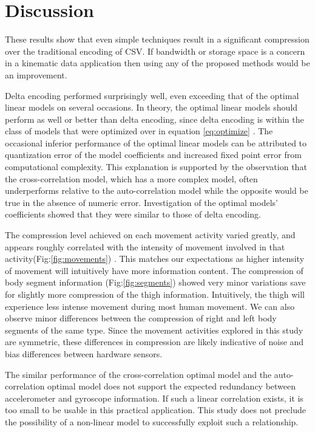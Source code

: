\documentclass[journal]{IEEEtran}
\begin{document}
\begin{table}[htbp]
{\begin{tabular}{|l|r|r|r|r|r|r|r|r|r|r|r|r|}
\end{tabular}%
}%

\end{table}



\section{Discussion}

These results show that even simple techniques result in a significant compression over the traditional encoding of CSV. If bandwidth or storage space is a concern in a kinematic data application then using any of the proposed methods would be an improvement.

Delta encoding performed surprisingly well, even exceeding that of the optimal linear models on several occasions. In theory, the optimal linear models should perform as well or better than delta encoding, since delta encoding is within the class of models that were optimized over in equation \eqref{eq:optimize} . The occasional inferior performance of the optimal linear models can be attributed to quantization error of the model coefficients and increased fixed point error from computational complexity. This explanation is supported by the observation that the cross-correlation model, which has a more complex model, often underperforms relative to the auto-correlation model while the opposite would be true in the absence of numeric error. Investigation of the optimal models' coefficients showed that they were similar to those of delta encoding.

The compression level achieved on each movement activity varied greatly, and appears roughly correlated with the intensity of movement involved in that activity(Fig:\ref{fig:movements}) . This matches our expectations as higher intensity of movement will intuitively have more information content. The compression of body segment information (Fig:\ref{fig:segments}) showed very minor variations save for slightly more compression of the thigh information. Intuitively, the thigh will experience less intense movement during most human movement. We can also observe minor differences between the compression of right and left body segments of the same type. Since the movement activities explored in this study are symmetric, these differences in compression are likely indicative of noise and bias differences between hardware sensors.

The similar performance of the cross-correlation optimal model and the auto-correlation optimal model does not support the expected redundancy between accelerometer and gyroscope information. If such a linear correlation exists, it is too small to be usable in this practical application. This study does not preclude the possibility of a non-linear model to successfully exploit such a relationship.
\end{document}
